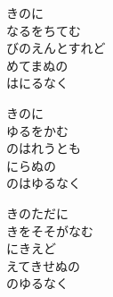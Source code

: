 \documentclass[10pt,b5j]{tarticle} %
\begin{document}
\vspace{1.5em} %
\newcommand{\linespace}{0.5em} %
\newcommand{\blocksize}{0.5\hsize} %
\begin{enumerate} %
    \begin{minipage}[c]{\blocksize}
    
        \vspace{\linespace}
        \item
        きのに\\
        なるをちてむ\\
        びのえんとすれど\\
        めてまぬの\\
        はにるなく
        
        \vspace{\linespace}
        \item
        きのに\\
        ゆるをかむ\\
        のはれうとも\\
        にらぬの\\
        のはゆるなく
        
        \vspace{\linespace}
        \item
        きのただに\\
        きをそそがなむ\\
        にきえど\\
        えてきせぬの\\
        のゆるなく
    
    \end{minipage}
\end{enumerate} %
\end{document}
